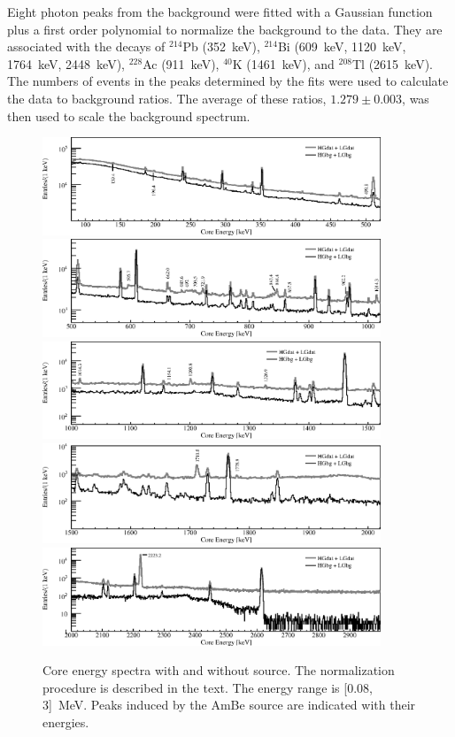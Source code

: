 Eight photon peaks from the background were fitted with a Gaussian function plus a first order polynomial to normalize the background to the data. They are associated with the decays of $^{214}$Pb (352~keV), $^{214}$Bi (609~keV, 1120~keV, 1764~keV, 2448~keV), $^{228}$Ac (911~keV), $^{40}$K (1461~keV), and $^{208}$Tl (2615~keV). The numbers of events in the peaks determined by the fits were used to calculate the data to background ratios. The average of these ratios, $1.279 \pm 0.003$, was then used to scale the background spectrum.

\begin{figure}[tbhp]
  \centering
  \includegraphics[width=0.9\textwidth,clip]{spectra_0_520keV}
  \includegraphics[width=0.9\textwidth,clip]{spectra_500_1020keV}
  \includegraphics[width=0.9\textwidth,clip]{spectra_1000_1520keV}
  \includegraphics[width=0.9\textwidth,clip]{spectra_1500_2020keV}
  \includegraphics[width=0.9\textwidth,clip]{spectra_2_3MeV}
  \caption{Core energy spectra with and without source. The
    normalization procedure is described in the text. The energy range
    is [0.08, 3]~MeV. Peaks induced by the AmBe source are indicated
    with their energies.}
  \label{fig:neu:spec}
\end{figure}

